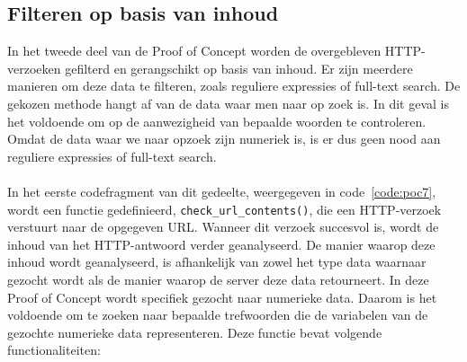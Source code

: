 \subsection{Filteren op basis van inhoud}
In het tweede deel van de Proof of Concept worden de overgebleven HTTP-verzoeken gefilterd en gerangschikt op basis van inhoud. Er zijn meerdere manieren om deze data te filteren, zoals reguliere expressies of full-text search. De gekozen methode hangt af van de data waar men naar op zoek is. In dit geval is het voldoende om op de aanwezigheid van bepaalde woorden te controleren. Omdat de data waar we naar opzoek zijn numeriek is, is er dus geen nood aan reguliere expressies of full-text search.
\\ \\
In het eerste codefragment van dit gedeelte, weergegeven in code~\ref{code:poc7}, wordt een functie gedefinieerd, \texttt{check\_url\_contents()}, die een HTTP-verzoek verstuurt naar de opgegeven URL. Wanneer dit verzoek succesvol is, wordt de inhoud van het HTTP-antwoord verder geanalyseerd. De manier waarop deze inhoud wordt geanalyseerd, is afhankelijk van zowel het type data waarnaar gezocht wordt als de manier waarop de server deze data retourneert. In deze Proof of Concept wordt specifiek gezocht naar numerieke data. Daarom is het voldoende om te zoeken naar bepaalde trefwoorden die de variabelen van de gezochte numerieke data representeren. Deze functie bevat volgende functionaliteiten:
